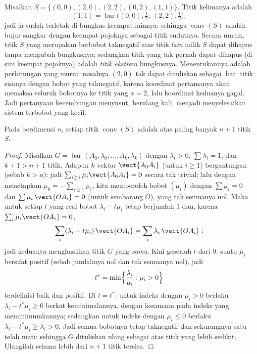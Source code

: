 \begin{example}\label{ex:b2:affine:squarehull}
Misalkan $S = \{(0,0), (2,0), (2,2), (0,2), (1,1)\}$. Titik
kelimanya adalah 
\[
(1,1) = \operatorname{bar}\bigl((0,0), \tfrac12;\ (2,2),
\tfrac12\bigr),
\]
jadi ia sudah terletak di bungkus keempat lainnya:
sehingga $\operatorname{conv}(S)$ adalah bujur sangkar dengan keempat pojoknya
sebagai titik sudutnya. Secara umum, titik $S$ yang merupakan
 berbobot taknegatif atas titik \emph{lain} milik
$S$ dapat dihapus tanpa mengubah bungkusnya; sedangkan titik yang
tak pernah dapat dihapus (di sini keempat pojoknya) adalah
\emph{titik ekstrem} bungkusnya. Menentukannya adalah perhitungan
 yang murni: misalnya $(2,0)$ tak dapat dituliskan sebagai
$\operatorname{bar}$ titik sisanya dengan bobot yang
taknegatif, karena koordinat pertamanya akan memaksa seluruh bobotnya
ke titik yang $x = 2$, lalu koordinat keduanya
gagal. Jadi pertanyaan kecembungan menyusut, berulang kali, menjadi
menyelesaikan sistem terbobot yang kecil.
\end{example}

\begin{theorem}[Carathéodory]\label{thm:b2:affine:caratheodory}
Pada  berdimensi $n$, setiap titik
$\operatorname{conv}(S)$ adalah  atas paling banyak $n + 1$ titik
$S$.
\end{theorem}

\begin{proof}
Misalkan $G = \operatorname{bar}(A_0, \lambda_0; \dots; A_k, \lambda_k)$
dengan $\lambda_i > 0$, $\sum\lambda_i = 1$, dan $k + 1 > n + 1$
titik. Adapun $k$ vektor $\vect{A_0A_i}$ (untuk $i \geq 1$) bergantungan
(sebab $k > n$): jadi $\sum_{i\geq1}\mu_i \vect{A_0A_i} = 0$ secara tak trivial;
lalu dengan menetapkan $\mu_0 = -\sum_{i\geq1}\mu_i$, kita memperoleh bobot $(\mu_i)$
dengan $\sum\mu_i = 0$ dan $\sum \mu_i\,\vect{OA_i} = 0$ (untuk sembarang $O$), yang tak
semuanya nol. Maka untuk setiap $t$ yang real bobot $\lambda_i - t\mu_i$
tetap berjumlah $1$ dan, karena $\sum_i\mu_i\vect{OA_i} = 0$,
\[
\sum_i(\lambda_i - t\mu_i)\,\vect{OA_i}
= \sum_i\lambda_i\,\vect{OA_i} :
\]
jadi keduanya menghasilkan titik $G$ yang \emph{sama}. Kini geserlah $t$ dari
$0$: suatu $\mu_i$ bersifat positif (sebab jumlahnya nol dan tak
semuanya nol), jadi
\[
t^* = \min\Bigl\{\frac{\lambda_i}{\mu_i} : \mu_i > 0\Bigr\}
\]
terdefinisi baik dan positif. Di $t = t^*$: untuk indeks dengan
$\mu_i > 0$ berlaku $\lambda_i - t^*\mu_i \geq 0$ berkat keminimalannya,
dengan kesamaan pada indeks yang meminimumkannya; sedangkan untuk indeks dengan $\mu_i
\leq 0$ berlaku $\lambda_i - t^*\mu_i \geq \lambda_i > 0$. Jadi semua
bobotnya tetap taknegatif dan sekurangnya satu telah mati: sehingga $G$
dituliskan ulang sebagai  atas titik yang lebih sedikit. Ulangilah selama lebih
dari $n + 1$ titik tersisa.
\end{proof}

